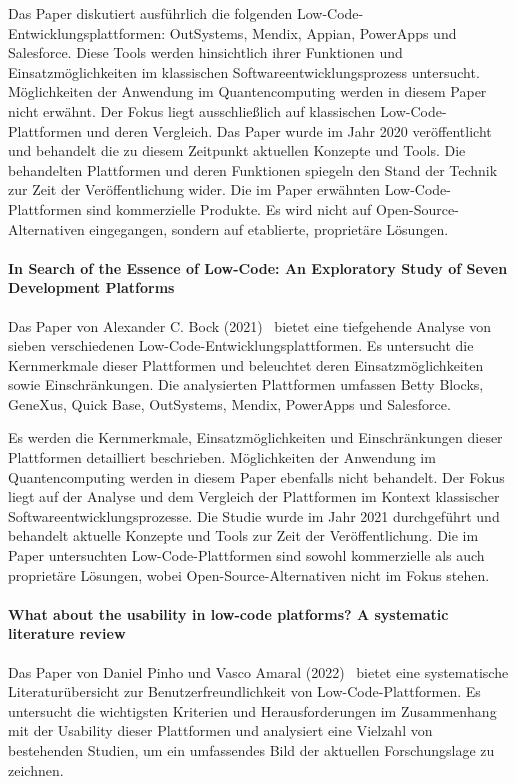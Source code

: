 Das Paper diskutiert ausführlich die folgenden Low-Code-Entwicklungsplattformen: OutSystems, Mendix, Appian, PowerApps und Salesforce. 
Diese Tools werden hinsichtlich ihrer Funktionen und Einsatzmöglichkeiten im klassischen Softwareentwicklungsprozess untersucht.
Möglichkeiten der Anwendung im Quantencomputing werden in diesem Paper nicht erwähnt. Der Fokus liegt ausschließlich auf klassischen 
Low-Code-Plattformen und deren Vergleich.
Das Paper wurde im Jahr 2020 veröffentlicht und behandelt die zu diesem Zeitpunkt aktuellen Konzepte und Tools. Die behandelten 
Plattformen und deren Funktionen spiegeln den Stand der Technik zur Zeit der Veröffentlichung wider.
Die im Paper erwähnten Low-Code-Plattformen sind kommerzielle Produkte. Es wird nicht auf Open-Source-Alternativen 
eingegangen, sondern auf etablierte, proprietäre Lösungen.

\paragraph{In Search of the Essence of Low-Code: An Exploratory Study of Seven Development Platforms}

Das Paper von Alexander C. Bock (2021)~\cite{Bock_2021_essence} bietet eine tiefgehende Analyse von sieben verschiedenen Low-Code-Entwicklungsplattformen. 
Es untersucht die Kernmerkmale dieser Plattformen und beleuchtet deren Einsatzmöglichkeiten sowie Einschränkungen. Die analysierten 
Plattformen umfassen Betty Blocks, GeneXus, Quick Base, OutSystems, Mendix, PowerApps und Salesforce.

Es werden die Kernmerkmale, Einsatzmöglichkeiten und Einschränkungen dieser Plattformen detailliert beschrieben. 
Möglichkeiten der Anwendung im Quantencomputing werden in diesem Paper ebenfalls nicht behandelt. 
Der Fokus liegt auf der Analyse und dem Vergleich der Plattformen im Kontext klassischer Softwareentwicklungsprozesse. 
Die Studie wurde im Jahr 2021 durchgeführt und behandelt aktuelle Konzepte und Tools zur Zeit der Veröffentlichung. 
Die im Paper untersuchten Low-Code-Plattformen sind sowohl kommerzielle als auch proprietäre Lösungen, 
wobei Open-Source-Alternativen nicht im Fokus stehen.

\paragraph{What about the usability in low-code platforms? A systematic literature review}

Das Paper von Daniel Pinho und Vasco Amaral (2022)~\cite{Pinho_2022} bietet eine systematische Literaturübersicht zur Benutzerfreundlichkeit von 
Low-Code-Plattformen. Es untersucht die wichtigsten Kriterien und Herausforderungen im Zusammenhang mit der Usability 
dieser Plattformen und analysiert eine Vielzahl von bestehenden Studien, um ein umfassendes Bild der aktuellen Forschungslage zu zeichnen.

